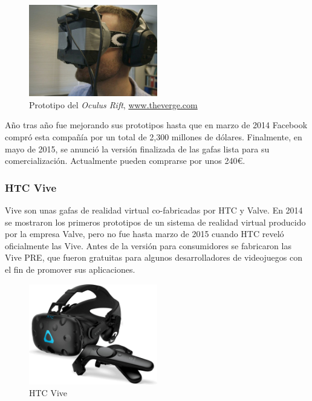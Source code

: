 \begin{figure}[!h]
\begin{center}
    \includegraphics[width=0.5\textwidth]{imagenes/2/oculus-prototipo.jpg}
    \caption{Prototipo del \textit{Oculus Rift}, \url{www.theverge.com}}
    \label{fig:oculus}
\end{center}
\end{figure}

Año tras año fue mejorando sus prototipos hasta que en marzo de 2014 Facebook compró esta compañía por un total de 2,300 millones de dólares. Finalmente, en mayo de 2015, se anunció la versión finalizada de las gafas lista para su comercialización. Actualmente pueden comprarse por unos 240\euro.

\subsubsection{HTC Vive} 

Vive son unas gafas de realidad virtual co-fabricadas por HTC y Valve. En 2014 se mostraron los primeros prototipos de un sistema de realidad virtual producido por la empresa Valve, pero no fue hasta marzo de 2015 cuando HTC reveló oficialmente las Vive. Antes de la versión para consumidores se fabricaron las Vive PRE, que fueron gratuitas para algunos desarrolladores de videojuegos con el fin de promover sus aplicaciones. 

\begin{figure}[!h]
\begin{center}
\includegraphics[width=0.5\textwidth]{imagenes/2/htc-vive.jpg}
\caption{HTC Vive}
\label{fig:htc-vive}
\end{center}
\end{figure}

